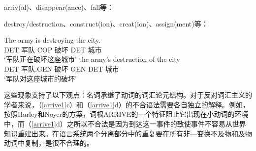 \begin{exe}\ex
\label{arrive1} 
arriv(al)、disappear(ance)、fall等：
\begin{xlist}[iv.]
\zl

\begin{exe}\ex
\label{trans}
destroy/destruction、construct(ion)、creat(ion)、assign(ment)等：
\begin{xlist}[iv.]
\ex 
\gll The army is destroying the city.\\
     DET 军队 COP 破坏 DET 城市\\
\glt `军队正在破坏这座城市'
\ex 
\gll the army's destruction of the city\\
     DET 军队.GEN 破坏 GEN DET 城市\\
\glt `军队对这座城市的破坏'
\zl

\noindent
这些现象支持了以下观点：名词承继了动词的词汇论元结构。对于反对词汇主义的学者来说，（\ref{arrive1}c）和（\ref{arrive1}d）的不合语法需要各自独立的解释。例如，按照Harley和Noyer\citeyear{HN2000a}的方案，词根ARRIVE的一个特征阻止它出现在小动词的环境中，而（\ref{arrive1}d）之所以不合法是因为到达这一事件的致使事件不容易从世界知识重建出来。在语言系统两个分离部分中的重复要在所有非—变换不及物和及物动词中复制，是很不合理的。


\end{xlist}
\end{exe}
\end{xlist}
\end{exe}

